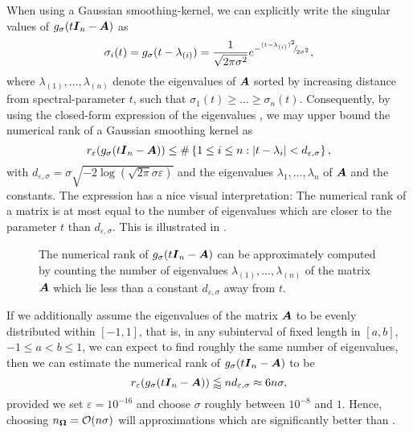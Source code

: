 When using a Gaussian smoothing-kernel, we can explicitly write the singular values of $g_{\sigma}(t\boldsymbol{I}_n - \boldsymbol{A})$ as
\begin{equation}
    \sigma_i(t) = g_{\sigma}(t - \lambda_{(i)}) = \frac{1}{\sqrt{2 \pi \sigma^2}} e^{-{}^{(t - \lambda_{(i)})^2}{\mskip -5mu/\mskip -3mu}_{2 \sigma^2}},
    \label{equ:gaussian-kernel-eigenvalues}
\end{equation}
where $\lambda_{(1)}, \dots, \lambda_{(n)}$ denote the eigenvalues of $\boldsymbol{A}$ sorted by increasing distance from spectral-parameter $t$, such that $\sigma_1(t) \geq \dots \geq \sigma_n(t)$. Consequently, by using the closed-form expression of the eigenvalues , we may upper bound the numerical rank of a Gaussian smoothing kernel as
\begin{equation}
    r_{\varepsilon}(g_{\sigma}(t\boldsymbol{I}_n - \boldsymbol{A})) \leq \#\left\{1\leq i\leq n: |t - \lambda_i| < d_{\varepsilon, \sigma} \right\},
    \label{equ:gaussian-kernel-numerical-rank}
\end{equation}
with $d_{\varepsilon, \sigma} = \sigma \sqrt{-2 \log(\sqrt{2 \pi} \sigma \varepsilon)}$ and the eigenvalues $\lambda_1, \dots, \lambda_n$ of $\boldsymbol{A}$ and the constants. The expression  has a nice visual interpretation: The numerical rank of a matrix is at most equal to the number of eigenvalues which are closer to the parameter $t$ than $d_{\varepsilon, \sigma}$. This is illustrated in .
\begin{figure}[ht]
    \centering
    
    \caption{The numerical rank of $g_{\sigma}(t\boldsymbol{I}_n - \boldsymbol{A})$ can be
        approximately computed by counting the number of eigenvalues
        $\lambda_{(1)}, \dots, \lambda_{(n)}$ of the matrix $\boldsymbol{A}$ which lie less than
        a constant $d_{\varepsilon, \sigma}$ away from $t$.}
    \label{fig:numerical-rank}
\end{figure}

If we additionally assume the eigenvalues of the matrix $\boldsymbol{A}$ to be evenly distributed within $[-1, 1]$, that is, in any subinterval of fixed length in $[a, b]$, $-1 \leq a < b \leq 1$, we can expect to find roughly the same number of eigenvalues, then we can estimate the numerical rank of $g_{\sigma}(t\boldsymbol{I}_n - \boldsymbol{A})$ to be
\begin{equation}
    r_{\varepsilon}(g_{\sigma}(t\boldsymbol{I}_n - \boldsymbol{A})) \lessapprox n d_{\varepsilon, \sigma} \approx 6 n \sigma,
    \label{equ:gaussian-kernel-numerical-rank-uniform}
\end{equation}
provided we set $\varepsilon = 10^{-16}$ and choose $\sigma$ roughly between $10^{-8}$ and $1$. Hence, choosing $n_{\boldsymbol{\Omega}} = \mathcal{O}(n \sigma)$ will approximations which are significantly better than .
